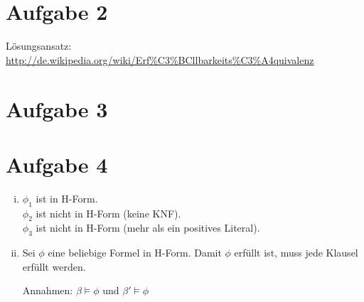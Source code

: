 \documentclass[a4paper,10pt]{article}
\begin{document}
\section*{Aufgabe 2}
Lösungsansatz: \url{http://de.wikipedia.org/wiki/Erf%C3%BCllbarkeits%C3%A4quivalenz}
\section*{Aufgabe 3}
\section*{Aufgabe 4}
\begin{enumerate}[(i)]
\item
$\phi_1$ ist in H-Form.\\
$\phi_2$ ist nicht in H-Form (keine KNF).\\
$\phi_3$ ist nicht in H-Form (mehr als ein positives Literal).\\
\item

Sei $\phi$ eine beliebige Formel in H-Form. Damit $\phi$ erfüllt ist, muss jede Klausel erfüllt werden. 

Annahmen: $\beta \models \phi$ und $\beta' \models \phi$


\end{enumerate}
\end{document}
